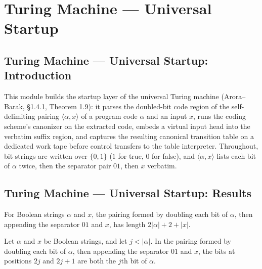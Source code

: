 \section{Turing Machine --- Universal Startup}
\subsection*{Turing Machine --- Universal Startup: Introduction}

This module builds the startup layer of the universal Turing machine
(Arora--Barak, \S 1.4.1, Theorem 1.9): it parses the doubled-bit code region
of the self-delimiting pairing $\langle \alpha, x\rangle$ of a program code
$\alpha$ and an input $x$, runs the coding scheme's canonizer on the extracted
code, embeds a virtual input head into the verbatim suffix region, and
captures the resulting canonical transition table on a dedicated work tape
before control transfers to the table interpreter.  Throughout, bit strings
are written over $\{0,1\}$ ($1$ for true, $0$ for false), and
$\langle \alpha, x\rangle$ lists each bit of $\alpha$ twice, then the
separator pair $01$, then $x$ verbatim.

\subsection*{Turing Machine --- Universal Startup: Results}

\begin{lemma}
\label{Turing.universal_pair_length}
\leanok
{}
For Boolean strings $\alpha$ and $x$, the pairing formed by doubling each bit of
$\alpha$, then appending the separator $01$ and $x$, has length $2|\alpha|+2+|x|$.
\end{lemma}

\begin{lemma}
\label{Turing.universal_pair_get}
\leanok
{}
Let $\alpha$ and $x$ be Boolean strings, and let $j<|\alpha|$. In the pairing formed by
doubling each bit of $\alpha$, then appending the separator $01$ and $x$, the bits at
positions $2j$ and $2j+1$ are both the $j$th bit of $\alpha$.
\end{lemma}

